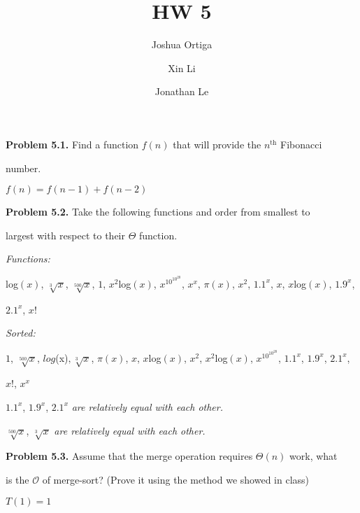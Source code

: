 \documentclass{article}
\title{HW 5}
\author{Joshua Ortiga \\
\and
Xin Li \\
\and
Jonathan Le}
\begin{document}
\maketitle
\textbf{Problem 5.1.} Find a function $f(n)$ that will provide the $n^{\text{th}}$ Fibonacci 

number.
\begin{center}
	$f(n) = f(n-1)+f(n-2)$
\end{center}

\vspace{0.5cm}

\textbf{Problem 5.2.} Take the following functions and order from smallest to 

largest with respect to their $\Theta$ function.

\vspace{0.25cm}

\textit{Functions:}

log$(x)$, $\sqrt[3]{x}$, $\sqrt[500]{x}$, $1$, $x^2$log$(x)$, $x^{10^{10^{20}}}$, $x^{x}$,
$\pi(x)$, $x^{2}$, $1.1^{x}$, $x$, $x$log$(x)$, $1.9^{x}$, 

$2.1^{x}$, $x!$

\vspace{0.25cm}

\textit{Sorted:}

$1$, $\sqrt[500]{x}$, $log$(x)$, \sqrt[3]{x}$, $\pi(x)$, $x$, $x$log$(x)$, $x^2$, $x^2$log$(x)$, $x^{10^{10^{20}}}$, $1.1^{x}$, $1.9^{x}$, $2.1^{x}$, 

$x!$, $x^{x}$

\vspace{0.25cm}

$1.1^{x}$, $1.9^{x}$, $2.1^{x}$ \textit{are relatively equal with each other.}

\vspace{0.25cm}

$\sqrt[500]{x}$, $\sqrt[3]{x}$ \textit{are relatively equal with each other.}

\vspace{0.5cm}

\textbf{Problem 5.3.} Assume that the merge operation requires $\Theta(n)$ work, what 

is the $\mathcal{O}$ of merge-sort? (Prove it using the method we showed in class)

\vspace{0.25cm}

$T(1) = 1$

\vspace{0.25cm}
\end{document}
